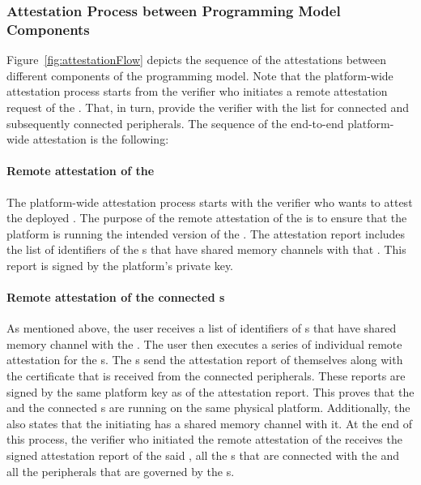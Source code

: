 \subsubsection{Attestation Process between Programming Model Components}
\label{sec:programmingModel:attestation:process}

Figure~\ref{fig:attestationFlow} depicts the sequence of the attestations between different components of the programming model. Note that the platform-wide attestation process starts from the verifier who initiates a remote attestation request of the \app. That, in turn, provide the verifier with the list for connected \ce and subsequently connected peripherals. The sequence of the end-to-end platform-wide attestation is the following:

  
\paragraph{Remote attestation of the \app} The platform-wide attestation process starts with the verifier who wants to attest the deployed \app. The purpose of the remote attestation of the \app is to ensure that the platform is running the intended version of the \app. The \app attestation report includes the list of identifiers of the \ce{}s that have shared memory channels with that \app. This report is signed by the platform's private key. 

\paragraph{Remote attestation of the connected \ce{}s} As mentioned above, the user receives a list of identifiers of \ce{}s that have shared memory channel with the \app. The user then executes a series of individual remote attestation for the \ce{}s. The \ce{}s send the attestation report of themselves along with the certificate that is received from the connected peripherals. These reports are signed by the same platform key as of the \app attestation report. This proves that the \app and the connected \ce{}s are running on the same physical platform. Additionally, the \ce also states that the initiating \app has a shared memory channel with it. At the end of this process, the verifier who initiated the remote attestation of the \app receives the signed attestation report of the said \app, all the \ce{}s that are connected with the \app and all the peripherals that are governed by the \ce{}s.

